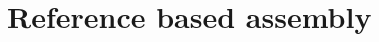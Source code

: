 \documentclass[doctor]{thesis}
\begin{document}



 

\makeatletter{}\section{Reference based assembly}
\end{document}
